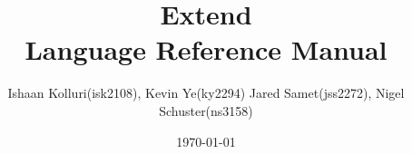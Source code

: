 \documentclass[titlepage]{article}
\title{Extend\\ Language Reference Manual}
\author{Ishaan Kolluri(isk2108), Kevin Ye(ky2294) Jared Samet(jss2272), Nigel Schuster(ns3158)}
\date{\today}
\begin{document}
\maketitle
\tableofcontents
\pagebreak






\end{document}
